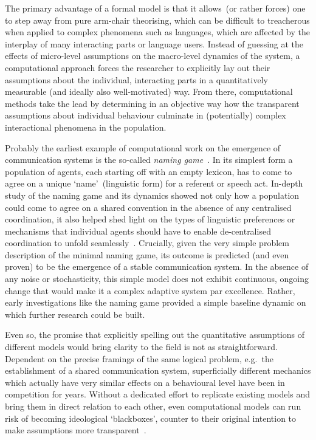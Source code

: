The primary advantage of a formal model is that it allows~(or rather forces) one to step away from pure arm-chair theorising, which can be difficult to treacherous when applied to complex phenomena such as languages, which are affected by the interplay of many interacting parts or language users. Instead of guessing at the effects of micro-level assumptions on the macro-level dynamics of the system, a computational approach forces the researcher to explicitly lay out their assumptions about the individual, interacting parts in a quantitatively measurable (and ideally also well-motivated) way. From there, computational methods take the lead by determining in an objective way how the transparent assumptions about individual behaviour culminate in (potentially) complex interactional phenomena in the population.

Probably the earliest example of computational work on the emergence of communication systems is the so-called \emph{naming game}~\citep{Steels1996,Steels1998naminggame,Baronchelli2006}.
In its simplest form a population of agents, each starting off with an empty lexicon, has to come to agree on a unique `name'~(linguistic form) for a referent or speech act. In-depth study of the naming game and its dynamics showed not only how a population could come to agree on a shared convention in the absence of any centralised coordination, it also helped shed light on the types of linguistic preferences or mechanisms that individual agents should have to enable de-centralised coordination to unfold seamlessly~\citep{DeVylder2006,Wellens2012,Spike2016}. 
Crucially, given the very simple problem description of the minimal naming game, its outcome is predicted (and even proven) to be the emergence of a stable communication system. In the absence of any noise or stochasticity, this simple model does not exhibit continuous, ongoing change that would make it a complex adaptive system par excellence. Rather, early investigations like the naming game provided a simple baseline dynamic on which further research could be built.

Even so, the promise that explicitly spelling out the quantitative assumptions of different models would bring clarity to the field is not as straightforward. Dependent on the precise framings of the same logical problem, e.g.~the establishment of a shared communication system, superficially different mechanics which actually have very similar effects on a behavioural level have been in competition for years. Without a dedicated effort to replicate existing models and bring them in direct relation to each other, even computational models can run risk of becoming ideological `blackboxes', counter to their original intention to make assumptions more transparent~\citep[see][for the exemplary case of proposed pressures]{Spike2016}.

